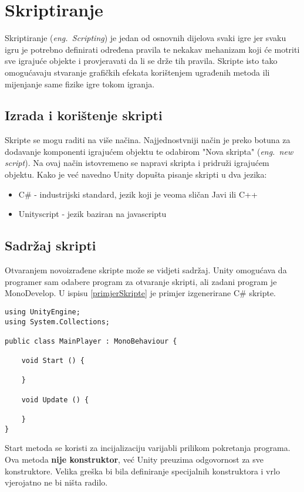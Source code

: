 \section{Skriptiranje}
Skriptiranje (\emph{eng.~Scripting}) je jedan od osnovnih dijelova svaki igre jer svaku igru je potrebno definirati određena pravila te nekakav mehanizam koji će motriti sve igrajuće objekte i provjeravati da li se drže tih pravila. Skripte isto tako omogućavaju stvaranje grafičkih efekata korištenjem ugrađenih metoda ili mijenjanje same fizike igre tokom igranja.
\subsection{Izrada i korištenje skripti}
Skripte se mogu raditi na više načina. Najjednostvniji način je preko botuna za dodavanje komponenti igrajućem objektu te odabirom "Nova skripta" (\emph{eng.~new script}). Na ovaj način istovremeno se napravi skripta i pridruži igrajućem objektu. Kako je već navedno Unity dopušta pisanje skripti u dva jezika:
\begin{itemize} 
	\item C\# - industrijski standard, jezik koji je veoma sličan Javi ili C++
	\item Unityscript - jezik baziran na javascriptu
\end{itemize}
\subsection{Sadržaj skripti}
Otvaranjem novoizrađene skripte može se vidjeti sadržaj. Unity omogućava da programer sam odabere program za otvaranje skripti, ali zadani program je MonoDevelop. U ispisu \ref{primjerSkripte}  je primjer izgenerirane C\# skripte.

\begin{lstlisting}[caption={Primjer skripte}, label=primjerSkripte]
using UnityEngine;
using System.Collections;

public class MainPlayer : MonoBehaviour {

    void Start () {
    
    }
    
    void Update () {
    
    }
}
\end{lstlisting}
Start metoda se koristi za incijalizaciju varijabli prilikom pokretanja programa. Ova metoda \textbf{nije konstruktor}, već Unity preuzima odgovornost za sve konstruktore. Velika greška bi bila definiranje specijalnih konstruktora i vrlo vjerojatno ne bi ništa radilo.

